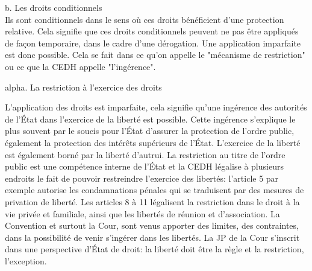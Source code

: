 \documentclass[10pt, a4paper, openany]{book}
\begin{document}
b. Les droits conditionnels \\
Ils sont conditionnels dans le sens où ces droits bénéficient d'une protection relative. Cela signifie que ces droits conditionnels peuvent ne pas être appliqués de façon temporaire, dans le cadre d'une dérogation. Une application imparfaite est donc possible. Cela se fait dans ce qu'on appelle le "mécanisme de restriction" ou ce que la CEDH appelle "l'ingérence".


alpha. La restriction à l'exercice des droits 


L'application des droits est imparfaite, cela signifie qu'une ingérence des autorités de l'État dans l'exercice de la liberté est possible. Cette ingérence s'explique le plus souvent par le soucis pour l'État d'assurer la protection de l'ordre public, également la protection des intérêts supérieurs de l'État. L'exercice de la liberté est également borné par la liberté d'autrui. La restriction au titre de l'ordre public est une compétence interne de l'État et la CEDH légalise à plusieurs endroits le fait de pouvoir restreindre l'exercice des libertés: l'article 5 par exemple autorise les condamnations pénales qui se traduisent par des mesures de privation de liberté. Les articles 8 à 11 légalisent la restriction dans le droit à la vie privée et familiale, ainsi que les libertés de réunion et d'association. La Convention et surtout la Cour, sont venus apporter des limites, des contraintes, dans la possibilité de venir s'ingérer dans les libertés. La JP de la Cour s'inscrit dans une perspective d'État de droit: la liberté doit être la règle et la restriction, l'exception.
\end{document}
